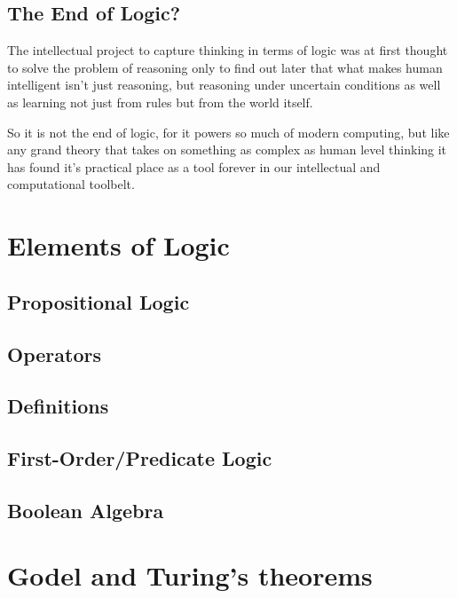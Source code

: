 \documentclass[]{book}
\theoremstyle{definition}
\theoremstyle{definition}
\theoremstyle{definition}
\theoremstyle{remark}
\begin{document}
\subsection{The End of Logic?}\label{the-end-of-logic}

The intellectual project to capture thinking in terms of logic was at
first thought to solve the problem of reasoning only to find out later
that what makes human intelligent isn't just reasoning, but reasoning
under uncertain conditions as well as learning not just from rules but
from the world itself.

So it is not the end of logic, for it powers so much of modern
computing, but like any grand theory that takes on something as complex
as human level thinking it has found it's practical place as a tool
forever in our intellectual and computational toolbelt.

\section{Elements of Logic}\label{elements-of-logic}

\subsection{Propositional Logic}\label{propositional-logic}

\subsection{Operators}\label{operators}

\subsection{Definitions}\label{definitions}

\subsection{First-Order/Predicate
Logic}\label{first-orderpredicate-logic}

\subsection{Boolean Algebra}\label{boolean-algebra}

\section{Godel and Turing's theorems}\label{godel-and-turings-theorems}
\end{document}
